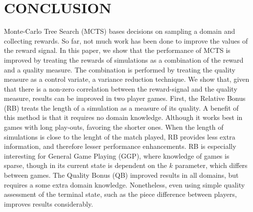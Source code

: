 \documentclass{ecai2014}
\begin{document}
\section{CONCLUSION}
\label{sec:concl}
Monte-Carlo Tree Search (MCTS) bases decisions on sampling a domain and collecting rewards. So far, not much work has been done to improve the values of the reward signal. In this paper, we show that the performance of MCTS is improved by treating the rewards of simulations as a combination of the reward and a quality measure. The combination is performed by treating the quality measure as a control variate, a variance reduction technique. We show that, given that there is a non-zero correlation between the reward-signal and the quality measure, results can be improved in two player games.
First, the Relative Bonus (RB) treats the length of a simulation as a measure of its quality. A benefit of this method is that it requires no domain knowledge. Although it works best in games with long play-outs, favoring the shorter ones. When the length of simulations is close to the lenght of the match played, RB provides less extra information, and therefore lesser performance enhancements. RB is especially interesting for General Game Playing (GGP), where knowledge of games is sparse, though in its current state is dependent on the $k$ parameter, which differs between games.
The Quality Bonus (QB) improved results in all domains, but requires a some extra domain knowledge. Nonetheless, even using simple quality assessment of the terminal state, such as the piece difference between players, improves results considerably.



\end{document}
